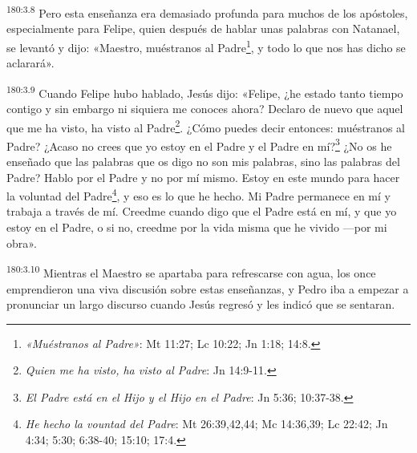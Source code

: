 \par
\textsuperscript{180:3.8} Pero esta enseñanza era demasiado profunda para muchos de los apóstoles, especialmente para Felipe, quien después de hablar unas palabras con Natanael, se levantó y dijo: «Maestro, muéstranos al Padre\footnote{\textit{«Muéstranos al Padre»}: Mt 11:27; Lc 10:22; Jn 1:18; 14:8.}, y todo lo que nos has dicho se aclarará».

\par
\textsuperscript{180:3.9} Cuando Felipe hubo hablado, Jesús dijo: «Felipe, ¿he estado tanto tiempo contigo y sin embargo ni siquiera me conoces ahora? Declaro de nuevo que aquel que me ha visto, ha visto al Padre\footnote{\textit{Quien me ha visto, ha visto al Padre}: Jn 14:9-11.}. ¿Cómo puedes decir entonces: muéstranos al Padre? ¿Acaso no crees que yo estoy en el Padre y el Padre en mí?\footnote{\textit{El Padre está en el Hijo y el Hijo en el Padre}: Jn 5:36; 10:37-38.} ¿No os he enseñado que las palabras que os digo no son mis palabras, sino las palabras del Padre? Hablo por el Padre y no por mí mismo. Estoy en este mundo para hacer la voluntad del Padre\footnote{\textit{He hecho la vountad del Padre}: Mt 26:39,42,44; Mc 14:36,39; Lc 22:42; Jn 4:34; 5:30; 6:38-40; 15:10; 17:4.}, y eso es lo que he hecho. Mi Padre permanece en mí y trabaja a través de mí. Creedme cuando digo que el Padre está en mí, y que yo estoy en el Padre, o si no, creedme por la vida misma que he vivido ---por mi obra».

\par
\textsuperscript{180:3.10} Mientras el Maestro se apartaba para refrescarse con agua, los once emprendieron una viva discusión sobre estas enseñanzas, y Pedro iba a empezar a pronunciar un largo discurso cuando Jesús regresó y les indicó que se sentaran.

